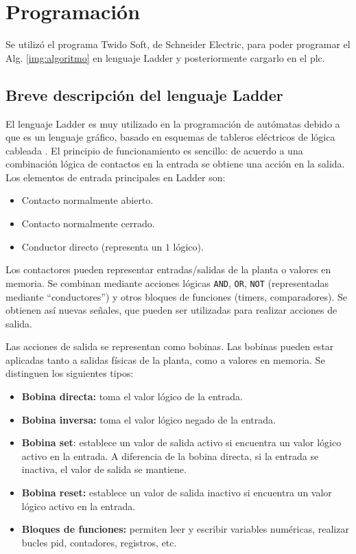 \section{Programación}
\label{sec:Programacion}
Se utilizó el programa Twido Soft, de Schneider Electric, para poder programar
el Alg. \ref{img:algoritmo} en lenguaje Ladder y posteriormente cargarlo en el
\gls{plc}.

\subsection{Breve descripción del lenguaje Ladder}

El lenguaje Ladder es muy utilizado en la programación de autómatas debido a
que es un lenguaje gráfico, basado en esquemas de tableros eléctricos de
lógica cableada \cite{bib:ApuntesPuglesiPLC}.
El principio de funcionamiento es sencillo: de acuerdo a una combinación
lógica de contactos en la entrada se obtiene una acción en la
salida.
Los elementos de entrada principales en Ladder son:

 \begin{itemize}
  \item Contacto normalmente abierto.
  \item Contacto normalmente cerrado.
  \item Conductor directo (representa un $1$ lógico).
 \end{itemize}

Los contactores pueden representar entradas/salidas de la
planta o valores en memoria.
Se combinan mediante acciones lógicas \verb|AND|, \verb|OR|, \verb|NOT|
(representadas mediante ``conductores'') y otros bloques de funciones (timers,
comparadores).
Se obtienen así nuevas señales, que pueden ser utilizadas para realizar
acciones de salida.

Las acciones de salida se representan como bobinas.
Las bobinas pueden estar aplicadas tanto a salidas físicas de la planta, como a
valores en memoria. Se distinguen los siguientes tipos:

  \begin{itemize}
   \item \textbf{Bobina directa:} toma el valor lógico de la entrada.
   \item \textbf{Bobina inversa:} toma el valor lógico negado de la entrada.
   \item \textbf{Bobina set}: establece un valor de salida activo si encuentra
un valor lógico activo en la entrada. A diferencia de la bobina directa, si la
entrada se inactiva, el valor de salida se mantiene.
   \item \textbf{Bobina reset:} establece un valor de salida inactivo si
encuentra un valor lógico activo en la entrada.
   \item \textbf{Bloques de funciones:} permiten leer y escribir variables
numéricas, realizar bucles \gls{pid}, contadores, registros, etc.
  \end{itemize}
  
